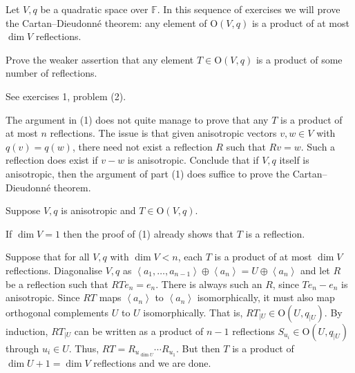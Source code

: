 \documentclass[12 pt, letterpaper]{hmcpset}
\begin{document}
\pagebreak


Let $V, q$ be a quadratic space over $\mathbb{F}$. In this sequence of exercises we will prove the Cartan--Dieudonn\'e theorem: any element of $\mathrm{O}(V, q)$ is a product of at most $\dim V$ reflections.

\begin{problem}[(1)]
	Prove the weaker assertion that any element $T \in \mathrm{O}(V, q)$ is a product of some number of reflections.
\end{problem}

\begin{solution}
	See exercises 1, problem (2).
\end{solution}

\pagebreak

\begin{problem}[(2)]
	The argument in (1) does not quite manage to prove that any $T$ is a product of at most $n$ reflections. The issue is that given anisotropic vectors $v, w \in V$ with $q(v) = q(w)$, there need not exist a reflection $R$ such that $Rv = w$. Such a reflection does exist if $v - w$ is anisotropic. Conclude that if $V, q$ itself is anisotropic, then the argument of part (1) does suffice to prove the Cartan--Dieudonn\'e theorem.
\end{problem}

\begin{solution}
	Suppose $V, q$ is anisotropic and $T \in \mathrm{O}(V, q)$. 

	If $\dim V = 1$ then the proof of (1) already shows that $T$ is a reflection.

	Suppose that for all $V, q$ with $\dim V < n$, each $T$ is a product of at most $\dim V$ reflections. Diagonalise $V, q$ as $\left < a_{1}, \dots, a_{n - 1} \right > \oplus \left < a_{n} \right > = U \oplus \left < a_{n} \right >$ and let $R$ be a reflection such that $RT e_{n} = e_{n}$. There is always such an $R$, since $T e_{n} - e_{n}$ is anisotropic. Since $RT$ maps $\left < a_{n} \right >$ to  $\left < a_{n} \right >$ isomorphically, it must also map orthogonal complements $U$ to $U$ isomorphically. That is, $RT_{\mid U} \in \mathrm{O}(U, q_{\mid U})$. By induction, $RT_{\mid U}$ can be written as a product of $n - 1$ reflections $S_{u_{i}} \in \mathrm{O}(U, q_{\mid U})$ through $u_{i} \in U$. Thus, $RT = R_{u_{\dim U}} \cdots R_{u_{1}}$. But then $T$ is a product of $\dim U + 1 = \dim V$ reflections and we are done.
\end{solution}
\end{document}
